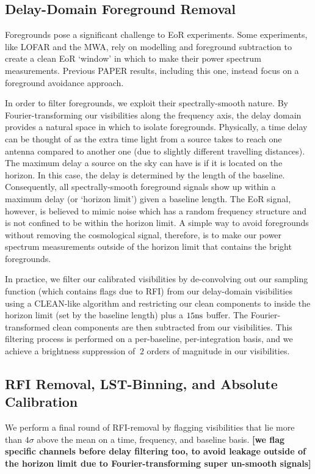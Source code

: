 \documentclass[preprint2,numberedappendix,tighten,twocolappendix]{aastex6}  %
\newcommand{\cc}[1]{{\color{purple} \textbf{[#1]}}}
\begin{document}
\subsection{Delay-Domain Foreground Removal}

Foregrounds pose a significant challenge to EoR experiments. Some experiments, like LOFAR and the MWA, rely on modelling and foreground subtraction to create a clean EoR `window' in which to make their power spectrum measurements. Previous PAPER results, including this one, instead focus on a foreground avoidance approach. 

In order to filter foregrounds, we exploit their spectrally-smooth nature. By Fourier-transforming our visibilities along the frequency axis, the delay domain provides a natural space in which to isolate foregrounds. Physically, a time delay can be thought of as the extra time light from a source takes to reach one antenna compared to another one (due to slightly different travelling distances). The maximum delay a source on the sky can have is if it is located on the horizon. In this case, the delay is determined by the length of the baseline. Consequently, all spectrally-smooth foreground signals show up within a maximum delay (or `horizon limit') given a baseline length. The EoR signal, however, is believed to mimic noise which has a random frequency structure and is not confined to be within the horizon limit. A simple way to avoid foregrounds without removing the cosmological signal, therefore, is to make our power spectrum measurements outside of the horizon limit that contains the bright foregrounds. 

In practice, we filter our calibrated visibilities by de-convolving out our sampling function (which contains flags due to RFI) from our delay-domain visibilities using a CLEAN-like algorithm and restricting our clean components to inside the horizon limit (set by the baseline length) plus a $15 {\rm ns}$ buffer. The Fourier-transformed clean components are then subtracted from our visibilities. This filtering process is performed on a per-baseline, per-integration basis, and we achieve a brightness suppression of $~2$ orders of magnitude in our visibilities. 

\subsection{RFI Removal, LST-Binning, and Absolute Calibration}

We perform a final round of RFI-removal by flagging visibilities that lie more than $4\sigma$ above the mean on a time, frequency, and baseline basis. \cc{we flag specific channels before delay filtering too, to avoid leakage outside of the horizon limit due to Fourier-transforming super un-smooth signals}
\end{document}
